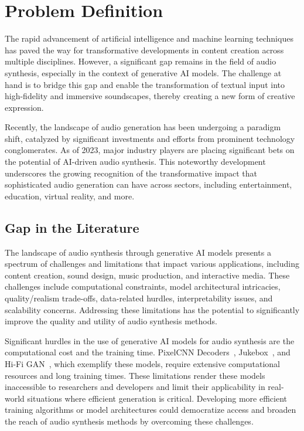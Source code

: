\section{Problem Definition} \label{sec:problem-definition}

The rapid advancement of artificial intelligence and machine learning techniques has paved the way for transformative developments in content creation across multiple disciplines. However, a significant gap remains in the field of audio synthesis, especially in the context of generative \ac{AI} models. The challenge at hand is to bridge this gap and enable the transformation of textual input into high-fidelity and immersive soundscapes, thereby creating a new form of creative expression.

Recently, the landscape of audio generation has been undergoing a paradigm shift, catalyzed by significant investments and efforts from prominent technology conglomerates. As of 2023, major industry players are placing significant bets on the potential of \ac{AI}-driven audio synthesis. This noteworthy development underscores the growing recognition of the transformative impact that sophisticated audio generation can have across sectors, including entertainment, education, virtual reality, and more.

\subsection{Gap in the Literature}

The landscape of audio synthesis through generative \ac{AI} models presents a spectrum of challenges and limitations that impact various applications, including content creation, sound design, music production, and interactive media. These challenges include computational constraints, model architectural intricacies, quality/realism trade-offs, data-related hurdles, interpretability issues, and scalability concerns. Addressing these limitations has the potential to significantly improve the quality and utility of audio synthesis methods.

Significant hurdles in the use of generative \ac{AI} models for audio synthesis are the computational cost and the training time. PixelCNN Decoders~\cite{oord_conditional_2016}, Jukebox~\cite{dhariwal_jukebox_2020}, and Hi-Fi GAN~\cite{kong_hifi-gan_2020}, which exemplify these models, require extensive computational resources and long training times. These limitations render these models inaccessible to researchers and developers and limit their applicability in real-world situations where efficient generation is critical. Developing more efficient training algorithms or model architectures could democratize access and broaden the reach of audio synthesis methods by overcoming these challenges.

